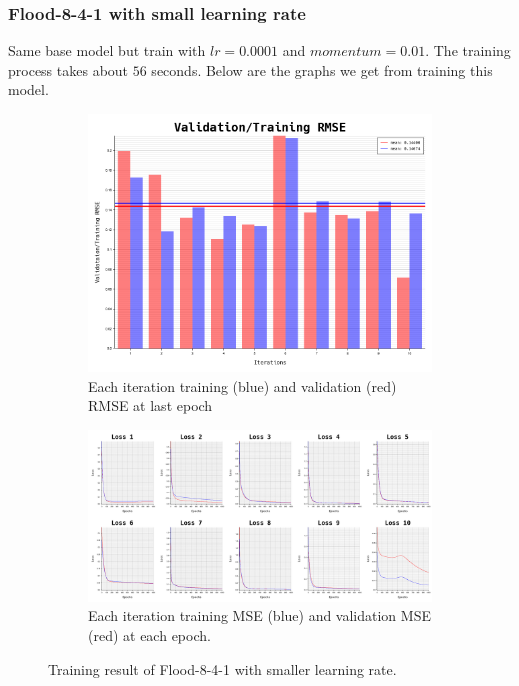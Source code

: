 \documentclass{article}
\begin{document}
\newpage
\subsubsection*{Flood-8-4-1 with small learning rate}
Same base model but train with $lr = 0.0001$ and $momentum = 0.01$.
The training process takes about $56$ seconds.
Below are the graphs we get from training this model. 
\begin{figure}[ht]
	\begin{subfigure}{\textwidth}
		\centering
		\includegraphics[scale=0.3]{flood-8-4-1_3/cv_l}
		\caption{Each iteration training (blue) and validation (red) RMSE at last epoch}
		\label{fig:4a}
	\end{subfigure}
	\begin{subfigure}{\textwidth}
		\includegraphics[width=\textwidth]{flood-8-4-1_3/loss}
		\caption{Each iteration training MSE (blue) and validation MSE (red) at each epoch.}
		\label{fig:4b}
	\end{subfigure}
	\caption{Training result of Flood-8-4-1 with smaller learning rate.}
	\label{fig:4}
\end{figure}
\FloatBarrier
\end{document}
